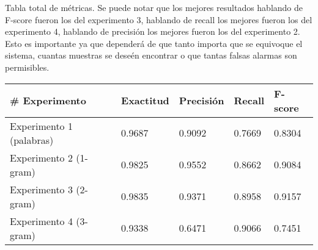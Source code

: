 
\caption{Tabla total de métricas. Se puede notar que los mejores resultados hablando de F-score fueron los del experimento 3, hablando de recall los mejores fueron los del experimento 4, hablando de precisión los mejores fueron los del experimento 2. Esto es importante ya que dependerá de que tanto importa que se equivoque el sistema, cuantas muestras se deseén encontrar o que tantas falsas alarmas son permisibles.}
\begin{tabular}{|l|llll|}
\hline
\# Experimento & Exactitud &     Precisión &     Recall  &   F-score \\ \hline
Experimento 1 (palabras) &       0.9687  &       0.9092  &       0.7669  &       0.8304  \\ \hline
Experimento 2 (1-gram) &       0.9825  &       {\color{OliveGreen} 0.9552}  &       0.8662  &       0.9084  \\ \hline
Experimento 3 (2-gram) &       {\color{OliveGreen} 0.9835}  &       0.9371  &       0.8958  &       {\color{OliveGreen} 0.9157}  \\ \hline
Experimento 4 (3-gram) &       0.9338  &       0.6471  &      {\color{OliveGreen}  0.9066}  &       0.7451  \\ \hline
\end{tabular}
